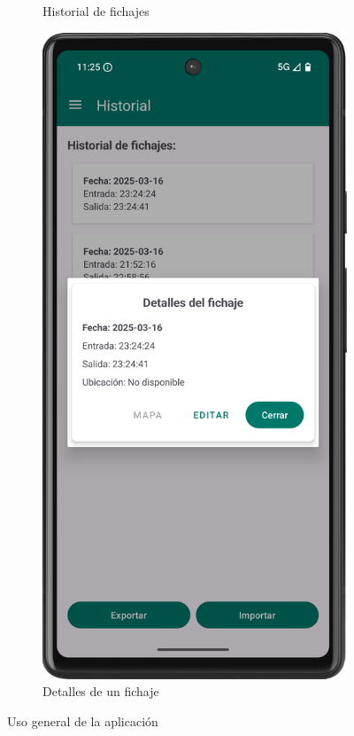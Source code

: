\begin{figure}[H]
\begin{subfigure}[b]{0.3\textwidth}
         \caption{Historial de fichajes}
         \label{fig:historial}
     \end{subfigure}
     \hfill
     \begin{subfigure}[b]{0.3\textwidth}
         \centering
         \includegraphics[width=\textwidth]{root/detalles.png}
         \caption{Detalles de un fichaje}
         \label{fig:detalles}
     \end{subfigure}
        \caption{Uso general de la aplicación}
        \label{fig:uso}
\end{figure}

